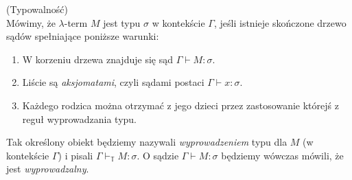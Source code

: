 \begin{definicja}(Typowalność)\\
  Mówimy, że \(\lambda\)-term \(M\) jest typu \(\sigma\) w kontekście \(\Gamma\), jeśli istnieje skończone drzewo sądów spełniające poniższe warunki:
  \begin{enumerate}[label=(D\arabic*)]
      \setlength\itemsep{0em}
      \item W korzeniu drzewa znajduje się sąd \(\Gamma \vdash M:\sigma\).
      \item Liście są \emph{aksjomatami}, czyli sądami postaci \(\Gamma \vdash x:\sigma\).
      \item Każdego rodzica można otrzymać z jego dzieci przez zastosowanie którejś z reguł wyprowadzania typu.
  \end{enumerate}
  Tak określony obiekt będziemy nazywali \emph{wyprowadzeniem} typu dla \(M\) (w kontekście \(\Gamma\)) i pisali \(\Gamma \vdash_\mathbb{T} M:\sigma\). O sądzie \(\Gamma \vdash M:\sigma\) będziemy wówczas mówili, że jest \emph{wyprowadzalny}. %
\end{definicja}

